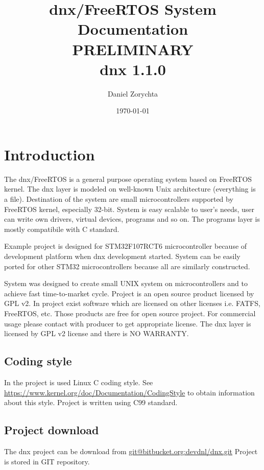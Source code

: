 \documentclass[a4paper,11pt]{report}
\title{dnx/FreeRTOS System Documentation\\[1em]PRELIMINARY\\[1em]dnx 1.1.0}
\author{Daniel Zorychta}
\date{\today}
\begin{document}
\maketitle
\tableofcontents

\chapter{Introduction}
The dnx/FreeRTOS is a general purpose operating system based on FreeRTOS kernel.
The dnx layer is modeled on well-known Unix architecture (everything is a file).
Destination  of  the  system  are  small  microcontrollers supported by FreeRTOS
kernel,  especially  32-bit.  System  is easy scalable to user's needs, user can
write own drivers,  virtual devices,  programs and so on.  The programs layer is
mostly compatibile with C standard.

Example project is designed for STM32F107RCT6 microcontroller because of development platform when
dnx development started. System can be easily ported for other STM32 microcontrollers because all
are similarly constructed.

System was designed to create small UNIX system on microcontrollers and to achieve fast
time-to-market cycle. Project is an open source product licensed by GPL v2. In project exist
software which are licensed on other licenses i.e. FATFS, FreeRTOS, etc. Those products are free
for open source project. For commercial usage please contact with producer to get appropriate
license. The dnx layer is licensed by GPL v2 license and there is NO WARRANTY.

\section{Coding style}
In the project is used Linux C coding style.
See \url{https://www.kernel.org/doc/Documentation/CodingStyle} to obtain information about
this style. Project is written using C99 standard.

\section{Project download}
The dnx project can be download from \url{git@bitbucket.org:devdnl/dnx.git}
Project is stored in GIT repository.

\end{document}
